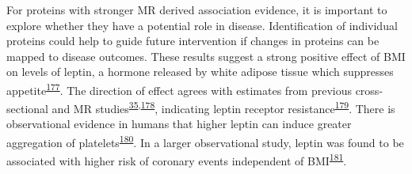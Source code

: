 \documentclass[11pt,twoside]{bristolthesis}
\begin{document}
For proteins with stronger MR derived association evidence, it is important to explore whether they have a potential role in disease. Identification of individual proteins could help to guide future intervention if changes in proteins can be mapped to disease outcomes. These results suggest a strong positive effect of BMI on levels of leptin, a hormone released by white adipose tissue which suppresses appetite\textsuperscript{\protect\hyperlink{ref-Klok2007}{177}}. The direction of effect agrees with estimates from previous cross-sectional and MR studies\textsuperscript{\protect\hyperlink{ref-Wurtz2014}{35},\protect\hyperlink{ref-Millard2015}{178}}, indicating leptin receptor resistance\textsuperscript{\protect\hyperlink{ref-Gruzdeva2019a}{179}}. There is observational evidence in humans that higher leptin can induce greater aggregation of platelets\textsuperscript{\protect\hyperlink{ref-Nakata1999}{180}}. In a larger observational study, leptin was found to be associated with higher risk of coronary events independent of BMI\textsuperscript{\protect\hyperlink{ref-Wallace2001}{181}}.
\end{document}

